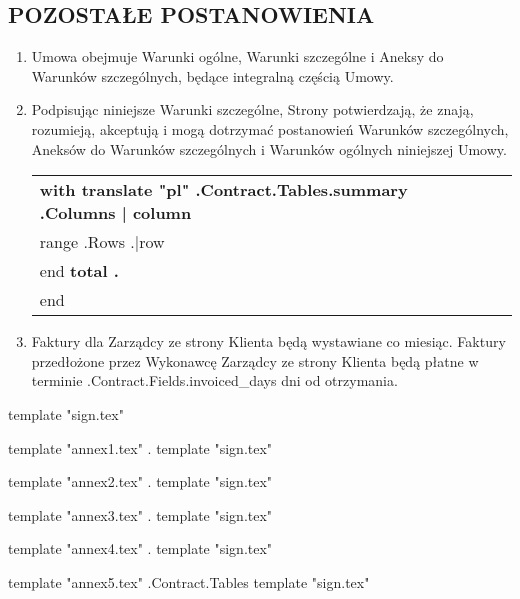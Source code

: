 \subsection{POZOSTAŁE POSTANOWIENIA}
\begin{enumerate}
	\item Umowa obejmuje Warunki ogólne, Warunki szczególne i Aneksy do Warunków szczególnych, będące integralną częścią Umowy.
	\item Podpisując niniejsze Warunki szczególne, Strony potwierdzają, że znają, rozumieją, akceptują i mogą dotrzymać postanowień Warunków szczególnych, Aneksów do Warunków szczególnych i Warunków ogólnych niniejszej Umowy.


\begin{center}
	\begin{tabu}{|X|X|X|X|}\tabucline{}\rowfont[c]\bfseries
	{{with translate "pl" .Contract.Tables.summary}} %
	{{.Columns | column}} \\\tabucline{}
	{{range .Rows}} %
	{{.|row}} \\\tabucline{}
	{{end}}
	\bfseries {{total .}} \\\tabucline{} %
	{{end}}
	\end{tabu}
\end{center}

\item Faktury dla Zarządcy ze strony Klienta będą wystawiane co miesiąc. Faktury przedłożone przez Wykonawcę Zarządcy ze strony Klienta będą płatne w terminie \iffalse input fields.invoiced_days value="{{.Contract.Fields.invoiced_days}}" \fi {{.Contract.Fields.invoiced_days}} dni od otrzymania.

\end{enumerate}

\vspace{2cm}
{{template "sign.tex"}} %

{{template "annex1.tex" .}} %
{{template "sign.tex"}} %

{{template "annex2.tex" .}} %
{{template "sign.tex"}} %

{{template "annex3.tex" .}} %
{{template "sign.tex"}} %

{{template "annex4.tex" .}} %
{{template "sign.tex"}} %

{{template "annex5.tex" .Contract.Tables}} %
{{template "sign.tex"}} %

